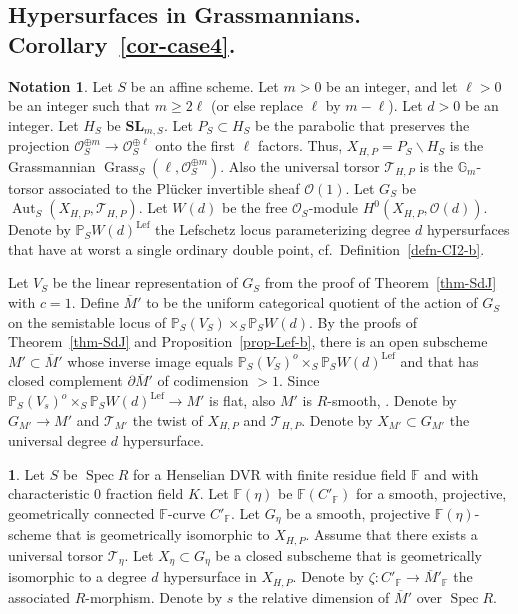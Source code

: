 \documentclass[11pt]{article}
\theoremstyle{definition}
\newtheorem{nota}[theo]{Notation}
\newcommand{\enoncename}{}
\newtheorem{corpusenonce}[theo]{\enoncename}
\newenvironment{enonce}[1]{\renewcommand{\enoncename}{#1}\begin{corpusenonce}}{\end{corpusenonce}}
\numberwithin{equation}{section}
\numberwithin{figure}{section}
\numberwithin{table}{section}
\newcommand{\mbb}{\mathbb}
\newcommand{\PP}{\mbb{P}}
\newcommand{\FF}{\mbb{F}}
\newcommand{\mc}{\mathcal}
\newcommand{\mcT}{\mc{T}}
\newcommand{\OO}{\mc{O}}
\newcommand{\ol}{\overline}
\newcommand{\Gm}[1]{\mathbb{G}_{#1}}
\newcommand{\Xx}{X}
\newcommand{\Cc}{C}
\newcommand{\FR}{K}
\DeclareMathOperator{\SP}{Spec}
\DeclareMathOperator{\Aut}{Aut}
\DeclareMathOperator{\Lef}{Lef}
\DeclareMathOperator{\Grass}{Grass}
\begin{document}
\subsection{Hypersurfaces in Grassmannians. Corollary~\ref{cor-case4}.} \label{subsec-Grass}

\begin{nota}\label{notat-CI-c}
Let $S$ be an affine scheme. Let $m>0$ be an integer, and let $\ell>0$ be an integer such that $m\geq 2\ell$ (or else replace $\ell$ by $m-\ell$). Let $d>0$ be an integer. Let $H_S$ be $\textbf{SL}_{m,S}$. Let $P_S\subset H_S$ be the parabolic that preserves the projection $\OO_S^{\oplus m} \to \OO_S^{\oplus \ell}$ onto the first $\ell$ factors. Thus, $X_{H,P}=P_S\backslash H_S$ is the Grassmannian $\Grass_S(\ell,\mathcal{O}_S^{\oplus m})$. Also the universal torsor $\mcT_{H,P}$ is the $\Gm{m}$-torsor associated to the Pl\"ucker invertible sheaf $\OO(1)$. Let $G_S$ be $\Aut_S(X_{H,P},\mcT_{H,P}).$ Let $W(d)$ be the free $\OO_S$-module $H^0(X_{H,P},\OO(d)).$ Denote by $\PP_S W(d)^{\Lef}$ the Lefschetz locus parameterizing degree $d$ hypersurfaces that have at worst a single ordinary double point, cf.~Definition~\ref{defn-CI2-b}.
\end{nota}

Let $V_S$ be the linear representation of $G_S$ from the proof of Theorem~\ref{thm-SdJ} with $c=1$. Define $\ol{M}'$ to be the uniform categorical quotient of the action of $G_S$ on the semistable locus of $\PP_S(V_S)\times_S \PP_S W(d)$. By the proofs of Theorem~\ref{thm-SdJ} and Proposition~\ref{prop-Lef-b}, there is an open subscheme $M'\subset \ol{M}'$ whose inverse image equals $\PP_S(V_S)^o
\times_S \PP_S W(d)^{\Lef}$ and that has closed complement $\partial \ol{M}'$ of codimension $>1$. Since $\PP_S(V_s)^o\times_S
\PP_S W(d)^{\Lef} \to M'$ is flat, also $M'$ is $R$-smooth, \cite[Proposition~17.7.7]{EGA4}. Denote by $G_{M'}\to M'$ and $\mcT_{M'}$ the twist of $\Xx_{H,P}$ and $\mcT_{H,P}$. Denote by $\Xx_{M'}\subset G_{M'}$ the universal degree $d$ hypersurface.

\begin{enonce}
{Hypothesis} \label{hyp-Grass}
Let $S$ be $\SP R$ for a Henselian DVR with finite residue field $\FF$ and with characteristic $0$ fraction field $\FR$. Let $\FF(\eta)$ be $\FF(\Cc'_{\FF})$ for a smooth, projective, geometrically connected $\FF$-curve $\Cc'_{\FF}$. Let $G_\eta$ be a smooth, projective $\FF(\eta)$-scheme that is geometrically isomorphic to $X_{H,P}$. Assume that there exists a universal torsor $\mcT_\eta$. Let $X_\eta\subset G_\eta$ be a closed subscheme that is geometrically isomorphic to a degree $d$ hypersurface in $X_{H,P}$. Denote by $\zeta:\Cc'_{\FF} \to \ol{M}'_{\FF}$ the associated $R$-morphism. Denote by $s$ the relative dimension of $\ol{M}'$ over $\SP R$.
\end{enonce}
\end{document}
